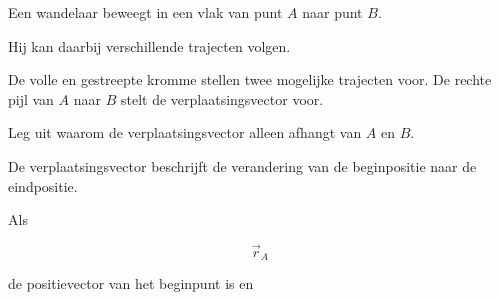 \documentclass{ximera}
\begin{document}
\begin{oefening}{\oefU\ESS}

  Een wandelaar beweegt in een vlak van punt $A$ naar punt $B$.
  
  Hij kan daarbij verschillende trajecten volgen.
  
  \begin{center}
  \end{center}
  
  De volle en gestreepte kromme stellen twee mogelijke trajecten voor.
  De rechte pijl van $A$ naar $B$ stelt de verplaatsingsvector voor.
  
  
  \begin{question}
  Leg uit waarom de verplaatsingsvector alleen afhangt van $A$ en $B$.
  
  \begin{oplossing}
  De verplaatsingsvector beschrijft de verandering van de beginpositie naar
  de eindpositie.
  
  Als
  
  \[
  \vec{r}_A
  \]
  
  de positievector van het beginpunt is en
  

\end{oplossing}
\end{question}
\end{oefening}
\end{document}

